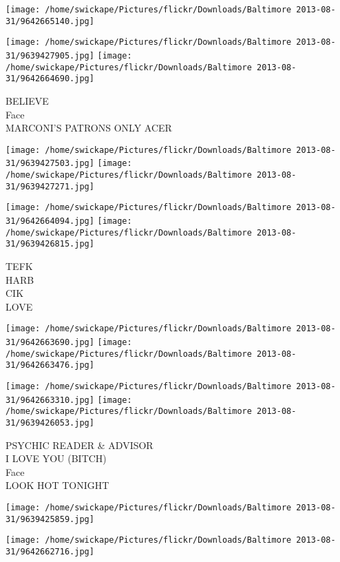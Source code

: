 \documentclass[10pt,letterpaper]{article}
\begin{document}
\texttt{[image: /home/swickape/Pictures/flickr/Downloads/Baltimore 2013-08-31/9642665140.jpg]}

\vspace{0.25in}
\texttt{[image: /home/swickape/Pictures/flickr/Downloads/Baltimore 2013-08-31/9639427905.jpg]}
\texttt{[image: /home/swickape/Pictures/flickr/Downloads/Baltimore 2013-08-31/9642664690.jpg]}

BELIEVE\\
Face\\
MARCONI'S PATRONS ONLY ACER\\
\pagebreak

\texttt{[image: /home/swickape/Pictures/flickr/Downloads/Baltimore 2013-08-31/9639427503.jpg]}
\texttt{[image: /home/swickape/Pictures/flickr/Downloads/Baltimore 2013-08-31/9639427271.jpg]}

\texttt{[image: /home/swickape/Pictures/flickr/Downloads/Baltimore 2013-08-31/9642664094.jpg]}
\texttt{[image: /home/swickape/Pictures/flickr/Downloads/Baltimore 2013-08-31/9639426815.jpg]}

TEFK\\
HARB\\
CIK\\
LOVE\\
\pagebreak

\texttt{[image: /home/swickape/Pictures/flickr/Downloads/Baltimore 2013-08-31/9642663690.jpg]}
\texttt{[image: /home/swickape/Pictures/flickr/Downloads/Baltimore 2013-08-31/9642663476.jpg]}

\texttt{[image: /home/swickape/Pictures/flickr/Downloads/Baltimore 2013-08-31/9642663310.jpg]}
\texttt{[image: /home/swickape/Pictures/flickr/Downloads/Baltimore 2013-08-31/9639426053.jpg]}

PSYCHIC READER \& ADVISOR\\
I LOVE YOU (BITCH)\\
Face\\
LOOK HOT TONIGHT\\
\pagebreak

\texttt{[image: /home/swickape/Pictures/flickr/Downloads/Baltimore 2013-08-31/9639425859.jpg]}

\vspace{0.25in}
\texttt{[image: /home/swickape/Pictures/flickr/Downloads/Baltimore 2013-08-31/9642662716.jpg]}
\end{document}
